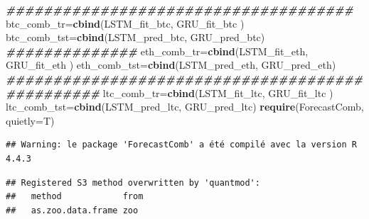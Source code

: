 \documentclass[
]{article}
\newenvironment{Shaded}{\begin{snugshade}}{\end{snugshade}}
\newcommand{\AttributeTok}[1]{\textcolor[rgb]{0.13,0.29,0.53}{#1}}
\newcommand{\DocumentationTok}[1]{\textcolor[rgb]{0.56,0.35,0.01}{\textbf{\textit{#1}}}}
\newcommand{\FunctionTok}[1]{\textcolor[rgb]{0.13,0.29,0.53}{\textbf{#1}}}
\newcommand{\NormalTok}[1]{#1}
\newcommand{\OtherTok}[1]{\textcolor[rgb]{0.56,0.35,0.01}{#1}}
\begin{document}
\begin{Shaded}
\begin{Highlighting}[]
\DocumentationTok{\#\#\#\#\#\#\#\#\#\#\#\#\#\#\#\#\#\#\#\#\#\#\#\#\#\#\#\#\#\#\#\#\#\#\#\#\#}
\NormalTok{btc\_comb\_tr}\OtherTok{=}\FunctionTok{cbind}\NormalTok{(LSTM\_fit\_btc, GRU\_fit\_btc )}
\NormalTok{btc\_comb\_tst}\OtherTok{=}\FunctionTok{cbind}\NormalTok{(LSTM\_pred\_btc, GRU\_pred\_btc)}
\DocumentationTok{\#\#\#\#\#\#\#\#\#\#\#\#\#\#}
\NormalTok{eth\_comb\_tr}\OtherTok{=}\FunctionTok{cbind}\NormalTok{(LSTM\_fit\_eth, GRU\_fit\_eth )}
\NormalTok{eth\_comb\_tst}\OtherTok{=}\FunctionTok{cbind}\NormalTok{(LSTM\_pred\_eth, GRU\_pred\_eth)}
\DocumentationTok{\#\#\#\#\#\#\#\#\#\#\#\#\#\#\#\#\#\#\#\#\#\#\#\#\#\#\#\#\#\#\#\#\#\#\#\#\#\#\#\#\#\#\#\#\#\#\#\#}
\NormalTok{ltc\_comb\_tr}\OtherTok{=}\FunctionTok{cbind}\NormalTok{(LSTM\_fit\_ltc, GRU\_fit\_ltc )}
\NormalTok{ltc\_comb\_tst}\OtherTok{=}\FunctionTok{cbind}\NormalTok{(LSTM\_pred\_ltc, GRU\_pred\_ltc)}
\FunctionTok{require}\NormalTok{(ForecastComb, }\AttributeTok{quietly=}\NormalTok{T)}
\end{Highlighting}
\end{Shaded}

\begin{verbatim}
## Warning: le package 'ForecastComb' a été compilé avec la version R 4.4.3
\end{verbatim}

\begin{verbatim}
## Registered S3 method overwritten by 'quantmod':
##   method            from
##   as.zoo.data.frame zoo
\end{verbatim}
\end{document}
